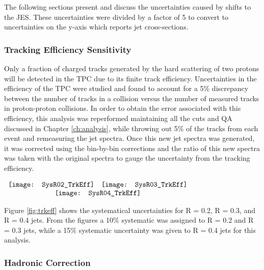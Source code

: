 The following sections present and discuss the uncertainties caused by shifts to the JES.  These uncertainties were divided by a factor of 5 to convert to uncertainties on the y-axis which reports jet cross-sections.

\subsubsection{Tracking Efficiency Sensitivity}
Only a fraction of charged tracks generated by the hard scattering of two protons will be detected in the TPC due to its finite track efficiency.  Uncertainties in the efficiency of the TPC were studied and found to account for a 5\% discrepancy\cite{Abelev:2013ala} between the number of tracks in a collision versus the number of measured tracks in proton-proton collisions.  In order to obtain the error associated with this efficiency, this analysis was reperformed maintaining all the cuts and QA discussed in Chapter \ref{ch:analysis}, while throwing out 5\% of the tracks from each event and remeasuring the jet spectra.  Once this new jet spectra was generated, it was corrected using the bin-by-bin corrections and the ratio of this new spectra was taken with the original spectra to gauge the uncertainty from the tracking efficiency.


\begin{figure*}[t!]
$\begin{array}{rl}
    \texttt{[image: SysR02\_TrkEff]} &
    \texttt{[image: SysR03\_TrkEff]}\\
    \multicolumn{2}{c}{\texttt{[image: SysR04\_TrkEff]}}
\end{array}$
\caption[Systematic due to TPC tracking efficiency.]{\label{fig:trkeff}Systematic due to TPC tracking efficiency; R = 0.2 \textit{(top left)}, R = 0.3 \textit{(top right)}, R = 0.4 \textit{(bottom)}.}
\end{figure*}

\noindent
Figure \ref{fig:trkeff} shows the systematical uncertainties for R = 0.2, R = 0.3, and R = 0.4 jets.  From the figures a 10\% systematic was assigned to R = 0.2 and R = 0.3 jets, while a 15\% systematic uncertainty was given to R = 0.4 jets for this analysis.

\subsubsection{Hadronic Correction}

